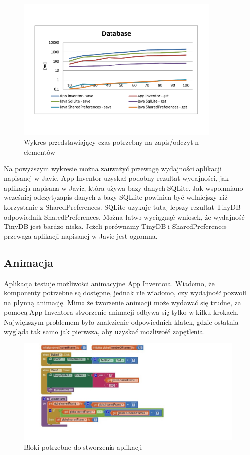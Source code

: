 \begin{figure}[H]
\centering\includegraphics[width=10cm]{figures/apps/databaseChart}
\caption{Wykres przedstawiający czas potrzebny na zapis/odczyt n-elementów}
\end{figure}

Na powyższym wykresie można zauważyć przewagę wydajności aplikacji napisanej w Javie. App Inventor uzyskał podobny rezultat wydajności, jak aplikacja napisana w Javie, która używa bazy danych SQLite. Jak wspomniano wcześniej odczyt/zapis danych z bazy SQLlite powinien być wolniejszy niż korzystanie z SharedPreferences. SQLite uzykuje tutaj lepszy rezultat TinyDB - odpowiednik SharedPreferences. Można łatwo wyciągnąć wniosek, że wydajność TinyDB jest bardzo niska. Jeżeli porównamy TinyDB i SharedPreferences przewaga aplikacji napisanej w Javie jest ogromna.


\subsection{Animacja}

Aplikacja testuje możliwości animacyjne App Inventora. Wiadomo, że komponenty potrzebne są dostępne, jednak nie wiadomo, czy wydajność pozwoli na płynną animację. Mimo że tworzenie animacji może wydawać się trudne, za pomocą App Inventora stworzenie animacji odbywa się tylko w kilku krokach. Największym problemem było znalezienie odpowiednich klatek, gdzie ostatnia wygląda tak samo jak pierwsza, aby uzyskać możliwość zapętlenia.


\begin{figure}[H]
\centering\includegraphics[width=15cm]{figures/apps/ai_animation}
\caption{Bloki potrzebne do stworzenia aplikacji}
\end{figure}

